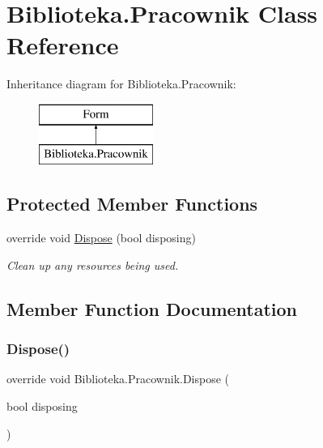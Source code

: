 \hypertarget{class_biblioteka_1_1_pracownik}{}\section{Biblioteka.\+Pracownik Class Reference}
\label{class_biblioteka_1_1_pracownik}
Inheritance diagram for Biblioteka.\+Pracownik\+:\begin{figure}[H]
\begin{center}
\leavevmode
\includegraphics[height=2.000000cm]{class_biblioteka_1_1_pracownik}
\end{center}
\end{figure}
\subsection*{Protected Member Functions}
\begin{DoxyCompactItemize}
\item 
override void \hyperlink{class_biblioteka_1_1_pracownik_a62a6ef549abc407e62d0992080bd8709}{Dispose} (bool disposing)
\begin{DoxyCompactList}\small\item\em Clean up any resources being used. \end{DoxyCompactList}\end{DoxyCompactItemize}


\subsection{Member Function Documentation}
\mbox{\label{class_biblioteka_1_1_pracownik_a62a6ef549abc407e62d0992080bd8709}} 
\subsubsection{\texorpdfstring{Dispose()}{Dispose()}}
{\footnotesize\ttfamily override void Biblioteka.\+Pracownik.\+Dispose (\begin{DoxyParamCaption}\item[{bool}]{disposing }\end{DoxyParamCaption})\hspace{0.3cm}{\ttfamily [protected]}}



